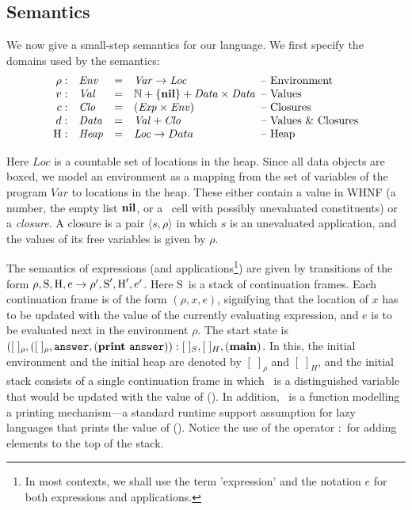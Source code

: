 \documentclass[9pt]{sigplanconf}
\newcommand{\stk}{\mbox{S}}
\begin{document}
\subsection{Semantics}
We now give  a small-step semantics for our  language.
We first specify the domains used by the semantics:
\[
\begin{array}{rlcl@{\hspace{0.5em}}l}
\rho: & \mathit{Env} &=&\mathit{Var} \rightarrow \mathit{Loc} &
\mbox{-- Environment} \\
v:   & \mathit{Val} &=& \mathbb{N} + \{\NIL\} + \mathit{Data \times
  Data}& \mbox{-- Values}\\
c:   & \mathit{Clo} &=& \mathit{(Exp \times Env)}& \mbox{--
  Closures}\\
d: & \mathit{Data} &=&\mathit{Val} + \mathit{Clo} & \mbox{-- Values \&
  Closures} \\
\heap: & \mathit{Heap} & =&\mathit{Loc} \rightarrow Data & \mbox{--
Heap}
\end{array}
\]

Here  $\mathit{Loc}$ is  a countable  set  of locations  in the  heap.
Since all data objects are boxed, we model an environment as a mapping
from the set  of variables of the program  $\mathit{Var}$ to locations
in the  heap.  These  either contain  a value in  WHNF (a  number, the
empty  list  $\mbox{$\mathbf{ nil}$}$,  or  a  \CONS\  cell  with  possibly  unevaluated
constituents) or  a {\em  closure}.  A closure  is a pair  $\langle s,
\rho\rangle$  in which  $s$  is an  unevaluated  application, and  the
values of its free variables is given by $\rho$.

The  semantics  of   expressions  (and  applications\footnote{In  most
  contexts, we  shall use  the term 'expression' and the notation $e$  for
both  expressions and
  applications.}) are  given by transitions  of the form  $\rho, \stk,
\heap, e \rightarrow \rho', \stk', \heap', e'$.  Here \stk\ is a stack
of  continuation  frames.  Each  continuation  frame  is  of the  form
$(\rho, x, e)$, signifying that the  location of $x$ has to be updated
with the  value of the currently  evaluating expression, and $e$  is to be
evaluated  next  in  the  environment  $\rho$.   The  start  state  is
$([\;]_\rho,([\;]_\rho,  \mathbf{\mbox{\tt answer}},   (\mathbf{print}~\mathbf{\mbox{\tt answer}})):[\;]_{S}  ,  [\;]_{H},
(\mathbf{main})$.  In  this, the initial  environment and the  initial heap
are  denoted  by  $[\;]_\rho$  and  $[\;]_H$, and  the  initial  stack
consists  of  a  single  continuation   frame  in  which  \ans\  is  a
distinguished  variable  that  would  be  updated with  the  value  of
(\mainpgm).  In  addition, \print\ is a function  modelling a printing
mechanism---a standard  runtime support assumption  for lazy languages
that prints the  value of (\mainpgm).  Notice the  use of the operator
$:$ for adding elements to the top of the stack.
\end{document}
